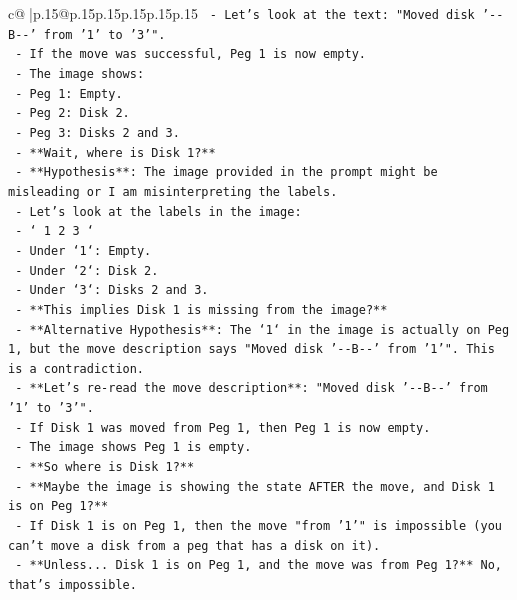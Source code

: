 \documentclass{article}
\begin{document}
{\begin{supertabular}{c@{$\;$}|p{.15\linewidth}@{}p{.15\linewidth}p{.15\linewidth}p{.15\linewidth}p{.15\linewidth}p{.15\linewidth}}
{{{\texttt{          {-} Let's look at the text: "Moved disk '{-}{-}B{-}{-}' from '1' to '3'".} \\
\texttt{          {-} If the move was successful, Peg 1 is now empty.} \\
\texttt{          {-} The image shows:} \\
\texttt{            {-} Peg 1: Empty.} \\
\texttt{            {-} Peg 2: Disk 2.} \\
\texttt{            {-} Peg 3: Disks 2 and 3.} \\
\texttt{          {-} **Wait, where is Disk 1?**} \\
\texttt{          {-} **Hypothesis**: The image provided in the prompt might be misleading or I am misinterpreting the labels.} \\
\texttt{          {-} Let's look at the labels in the image:} \\
\texttt{            {-} `   1       2       3   `} \\
\texttt{            {-} Under `1`: Empty.} \\
\texttt{            {-} Under `2`: Disk 2.} \\
\texttt{            {-} Under `3`: Disks 2 and 3.} \\
\texttt{          {-} **This implies Disk 1 is missing from the image?**} \\
\texttt{          {-} **Alternative Hypothesis**: The `1` in the image is actually on Peg 1, but the move description says "Moved disk '{-}{-}B{-}{-}' from '1'". This is a contradiction.} \\
\texttt{          {-} **Let's re{-}read the move description**: "Moved disk '{-}{-}B{-}{-}' from '1' to '3'".} \\
\texttt{          {-} If Disk 1 was moved from Peg 1, then Peg 1 is now empty.} \\
\texttt{          {-} The image shows Peg 1 is empty.} \\
\texttt{          {-} **So where is Disk 1?**} \\
\texttt{          {-} **Maybe the image is showing the state AFTER the move, and Disk 1 is on Peg 1?**} \\
\texttt{          {-} If Disk 1 is on Peg 1, then the move "from '1'" is impossible (you can't move a disk from a peg that has a disk on it).} \\
\texttt{          {-} **Unless... Disk 1 is on Peg 1, and the move was from Peg 1?** No, that's impossible.} \\
}}}
\end{supertabular}}
\end{document}
